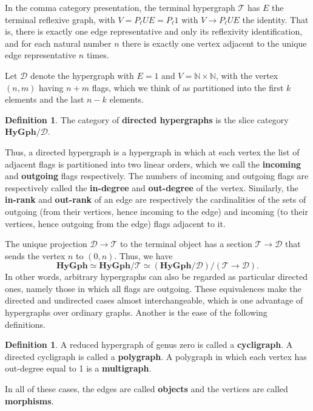 \documentclass{article}
\theoremstyle{definition}
\newtheorem{defn}[thm]{Definition}
\theoremstyle{remark}
\def\N{\mathbb{N}}
\def\hy{\mathbf{HyGph}}
\def\thy{\mathcal{T}}
\def\dhy{\mathcal{D}}
\begin{document}
In the comma category presentation, the terminal hypergraph $\thy$ has $E$ the terminal reflexive graph, with $V = P_\ell U E = P_\ell 1$ with $V\to P_\ell U E$ the identity.
That is, there is exactly one edge representative and only its reflexivity identification, and for each natural number $n$ there is exactly one vertex adjacent to the unique edge representative $n$ times.

Let $\dhy$ denote the hypergraph with $E=1$ and $V=\N\times \N$, with the vertex $(n,m)$ having $n+m$ flags, which we think of as partitioned into the first $k$ elements and the last $n-k$ elements.

\begin{defn}
  The category of \textbf{directed hypergraphs} is the slice category $\hy/\dhy$.
\end{defn}

Thus, a directed hypergraph is a hypergraph in which at each vertex the list of adjacent flags is partitioned into two linear orders, which we call the \textbf{incoming} and \textbf{outgoing} flags respectively.
The numbers of incoming and outgoing flags are respectively called the \textbf{in-degree} and \textbf{out-degree} of the vertex.
Similarly, the \textbf{in-rank} and \textbf{out-rank} of an edge are respectively the cardinalities of the sets of outgoing (from their vertices, hence incoming to the edge) and incoming (to their vertices, hence outgoing from the edge) flags adjacent to it.

The unique projection $\dhy\to\thy$ to the terminal object has a section $\thy\to\dhy$ that sends the vertex $n$ to $(0,n)$.
Thus, we have
\[\hy \simeq \hy/\thy \simeq (\hy/\dhy)/(\thy\to\dhy).\]
In other words, arbitrary hypergraphs can also be regarded as particular directed ones, namely those in which all flags are outgoing.
These equivalences make the directed and undirected cases almost interchangeable, which is one advantage of hypergraphs over ordinary graphs.
Another is the ease of the following definitions.

\begin{defn}
  A reduced hypergraph of genus zero is called a \textbf{cycligraph}.
  A directed cycligraph is called a \textbf{polygraph}.
  A polygraph in which each vertex has out-degree equal to 1 is a \textbf{multigraph}.

  In all of these cases, the edges are called \textbf{objects} and the vertices are called \textbf{morphisms}.
\end{defn}
\end{document}
